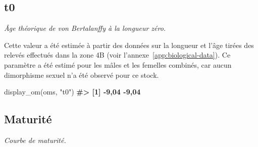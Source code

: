 \documentclass[french,11pt]{book}
\newenvironment{Shaded}{\begin{snugshade}}{\end{snugshade}}
\newcommand{\CommentTok}[1]{\textcolor[rgb]{0.56,0.35,0.01}{\textbf{#1}}}
\newcommand{\FunctionTok}[1]{\textcolor[rgb]{0.00,0.00,0.00}{#1}}
\newcommand{\NormalTok}[1]{#1}
\newcommand{\StringTok}[1]{\textcolor[rgb]{0.31,0.60,0.02}{#1}}
\begin{document}
\subsection{t0}
\label{app:desc-stock-t0-yelloweye}

\emph{Âge théorique de von Bertalanffy à la longueur zéro.}

Cette valeur a été estimée à partir des données sur la longueur et l'âge tirées des relevés effectués dans la zone 4B (voir l'annexe~\ref{app:biological-data}). Ce paramètre a été estimé pour les mâles et les femelles combinés, car aucun dimorphisme sexuel n'a été observé pour ce stock.
\begin{Shaded}
\begin{Highlighting}[]
\FunctionTok{display\_om}\NormalTok{(oms, }\StringTok{"t0"}\NormalTok{)}
\CommentTok{\#\textgreater{} [1] {-}9,04 {-}9,04}
\end{Highlighting}
\end{Shaded}
\subsection{Maturité}
\label{app:desc-stock-maturity-yelloweye}

\emph{Courbe de maturité.}
\end{document}
